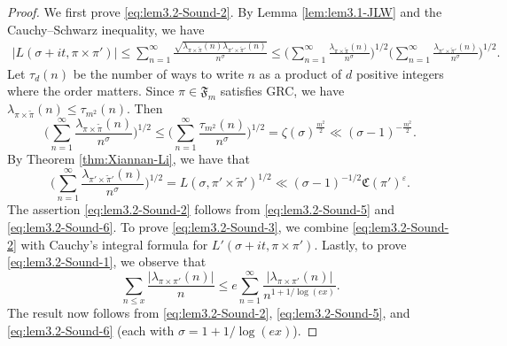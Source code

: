 \documentclass[12pt,reqno]{amsart}
\theoremstyle{remark}
\numberwithin{equation}{section}
\begin{document}
	\begin{proof} 
		We first prove \eqref{eq:lem3.2-Sound-2}.
        By Lemma \ref{lem:lem3.1-JLW} and the Cauchy--Schwarz inequality, we have
        \begin{equation*}
	\begin{aligned}
            |L(\sigma+it, \pi \times \pi')| \le \sum_{n=1}^{\infty} \frac{\sqrt{\lambda_{\pi \times \widetilde{\pi}}(n)\lambda_{\pi' \times \widetilde{\pi}'}(n)}}{n^{\sigma}}
            \le \Big(\sum_{n=1}^{\infty} \frac{\lambda_{\pi \times \widetilde{\pi}}(n)}{n^{\sigma}}\Big)^{1/2}\Big(\sum_{n=1}^{\infty} \frac{\lambda_{\pi' \times \widetilde{\pi}'}(n)}{n^{\sigma}}\Big)^{1/2}.
	\end{aligned}
        \end{equation*}
	 Let $\tau_d(n)$ be the number of ways to write $n$ as a product of $d$ positive integers where the order matters.  Since $\pi \in \mathfrak{F}_m$ satisfies GRC, we have $\lambda_{\pi \times \widetilde{\pi}}(n) \le \tau_{m^2}(n)$.  Then
    \begin{equation}
        \label{eq:lem3.2-Sound-5}
        \Big(\sum_{n=1}^{\infty} \frac{\lambda_{\pi \times \widetilde{\pi}}(n)}{n^{\sigma}}\Big)^{1/2} \le \Big(\sum_{n=1}^{\infty} \frac{\tau_{m^2}(n)}{n^{\sigma}}\Big)^{1/2} = \zeta(\sigma)^{\frac{m^2}{2}} \ll (\sigma-1)^{-\frac{m^2}{2}}.
    \end{equation}
    By Theorem \ref{thm:Xiannan-Li}, we have that 
    \begin{equation}
        \label{eq:lem3.2-Sound-6}
        \Big(\sum_{n=1}^{\infty} \frac{\lambda_{\pi' \times \widetilde{\pi}'}(n)}{n^{\sigma}}\Big)^{1/2} = L(\sigma, \pi' \times \widetilde{\pi}')^{1/2} \ll (\sigma-1)^{-1/2}\mathfrak{C}(\pi')^{\varepsilon}.
    \end{equation} 
    The assertion \eqref{eq:lem3.2-Sound-2} follows from \eqref{eq:lem3.2-Sound-5} and \eqref{eq:lem3.2-Sound-6}. To prove \eqref{eq:lem3.2-Sound-3}, we combine \eqref{eq:lem3.2-Sound-2}  with Cauchy's integral formula for $L'(\sigma +it, \pi \times \pi')$. Lastly, to prove \eqref{eq:lem3.2-Sound-1}, we observe that
    \begin{equation*}
        \label{eq:prelim(1)-1}
        \sum_{n \le x} \frac{|\lambda_{\pi \times \pi'}(n)|}{n} \leq e \sum_{n=1}^{\infty}\frac{|\lambda_{\pi \times \pi'}(n)|}{n^{1+1/\log(ex)}}.
    \end{equation*}
    The result now follows from \eqref{eq:lem3.2-Sound-2}, \eqref{eq:lem3.2-Sound-5}, and \eqref{eq:lem3.2-Sound-6} (each with $\sigma=1+1/\log(ex)$).
    \end{proof}
\end{document}
